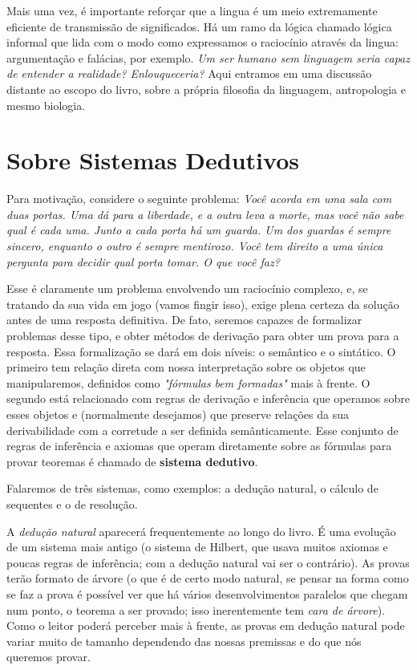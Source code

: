 Mais uma vez, é importante reforçar que a lingua é um meio extremamente eficiente de transmissão de significados.
Há um ramo da lógica chamado lógica informal que lida com o modo como expressamos o raciocínio através da lingua: argumentação e falácias, por exemplo. \textit{Um ser humano sem linguagem seria capaz de entender a realidade? Enlouqueceria?} Aqui entramos em uma discussão distante ao escopo do livro, sobre a própria filosofia da linguagem, antropologia e mesmo biologia.

\section{Sobre Sistemas Dedutivos}
Para motivação, considere o seguinte problema: \textit{Você acorda em uma sala com duas portas. Uma dá para a liberdade, e a outra leva a morte, mas você não sabe qual é cada uma.
Junto a cada porta há um guarda. Um dos guardas é sempre sincero, enquanto o outro é sempre mentirozo. Você tem direito a uma única pergunta para decidir qual porta tomar. O que você faz?}

Esse é claramente um problema envolvendo um raciocínio complexo, e, se tratando da sua vida em jogo (vamos fingir isso), exige plena certeza da solução antes de uma resposta definitiva.
De fato, seremos capazes de formalizar problemas desse tipo, e obter métodos de derivação para obter um prova para a resposta. Essa formalização se dará em dois níveis: o semântico e o sintático. O primeiro tem relação direta com nossa interpretação sobre os objetos que manipularemos, definidos como \textit{"fórmulas bem formadas"} mais à frente. O segundo está relacionado com regras de derivação e inferência que operamos sobre esses objetos e (normalmente desejamos) que preserve relações da sua derivabilidade com a corretude a ser definida semânticamente. Esse conjunto de regras de inferência e axiomas que operam diretamente sobre as fórmulas para provar teoremas é chamado de \textbf{sistema dedutivo}.

Falaremos de três sistemas, como exemplos: a dedução natural, o cálculo de sequentes e o de resolução.

A \textit{dedução natural} aparecerá frequentemente ao longo do livro. É uma evolução de um sistema mais antigo (o sistema de Hilbert, que usava muitos axiomas e poucas regras de inferência; com a dedução natural vai ser o contrário). As provas terão formato de árvore (o que é de certo modo natural, se pensar na forma como se faz a prova é possível ver que há vários desenvolvimentos paralelos que chegam num ponto, o teorema a ser provado; isso inerentemente tem \textit{cara de árvore}). Como o leitor poderá perceber mais à frente, as provas em dedução natural pode variar muito de tamanho dependendo das nossas premissas e do que nós queremos provar.

